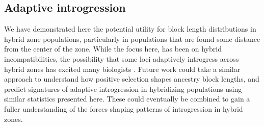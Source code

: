 \documentclass[11pt,letterpaper]{article}
\newcommand{\plr}[1]{{\em \color{blue} #1}}
\begin{document}


\subsection*{Adaptive introgression}

We have demonstrated here the potential utility for block length distributions in hybrid zone populations, particularly in populations that are found some distance from the center of the zone. While the focus here, has been on hybrid incompatibilities, the possibility that some loci adaptively introgress across hybrid zones has excited many biologists \citep{Arnold2004}. Future work could take a similar approach to understand how positive selection shapes ancestry block lengths, and predict  signatures of adaptive introgression in hybridizing populations using similar statistics presented here. These could eventually be combined to gain a fuller understanding of the forces shaping patterns of introgression in hybrid zones. 
\end{document}
